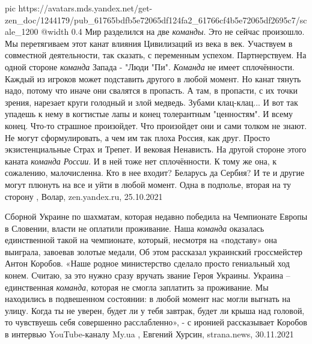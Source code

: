 \ifcmt
   pic https://avatars.mds.yandex.net/get-zen_doc/1244179/pub_61765bdfb5e72065df124fa2_61766cf4b5e72065df2695c7/scale_1200
	 @width 0.4
\fi
Мир разделился на две \emph{команды}. Это не сейчас произошло. Мы перетягиваем этот
канат влияния Цивилизаций из века в век. Участвуем в совместной деятельности,
так сказать, с переменным успехом. Партнерствуем.  На одной стороне
\emph{команда} Запада - "Люди "Пи". \emph{Команда} не имеет сплочённости.
Каждый из игроков может подставить другого в любой момент. Но канат тянуть
надо, потому что иначе они свалятся в пропасть. А там, в пропасти, с их точки
зрения, нарезает круги голодный и злой медведь. Зубами клац-клац... И вот так
упадешь к нему в когтистые лапы и конец толерантным "ценностям". И всему конец.
Что-то страшное произойдет. Что произойдет они и сами толком не знают. Не могут
сформулировать, а чем им так плоха Россия, как друг. Просто экзистенциальные
Страх и Трепет. И вековая Ненависть.  На другой стороне этого каната
\emph{команда России}. И в ней тоже нет сплочённости. К тому же она, к
сожалению, малочисленна. Кто в нее входит? Беларусь да Сербия? И те и другие
могут плюнуть на все и уйти в любой момент. Одна в подполье, вторая на ту
сторону
, Волар, zen.yandex.ru, 25.10.2021

Сборной Украине по шахматам, которая недавно победила на Чемпионате Европы в
Словении, власти не оплатили проживание.  Наша \emph{команда} оказалась
единственной такой на чемпионате, который, несмотря на «подставу» она выиграла,
завоевав золотые медали, Об этом рассказал украинский гроссмейстер Антон
Коробов.  «Наше родное министерство сделало просто гениальный ход конем.
Считаю, за это нужно сразу вручать звание Героя Украины. Украина – единственная
\emph{команда}, которая не смогла заплатить за проживание. Мы находились в
подвешенном состоянии: в любой момент нас могли выгнать на улицу. Когда ты не
уверен, будет ли у тебя завтрак, будет ли крыша над головой, то чувствуешь себя
совершенно расслабленно», - с иронией рассказывает Коробов в интервью
YouTube-каналу My.ua
, 
Евгений Хурсин, strana.news, 30.11.2021

